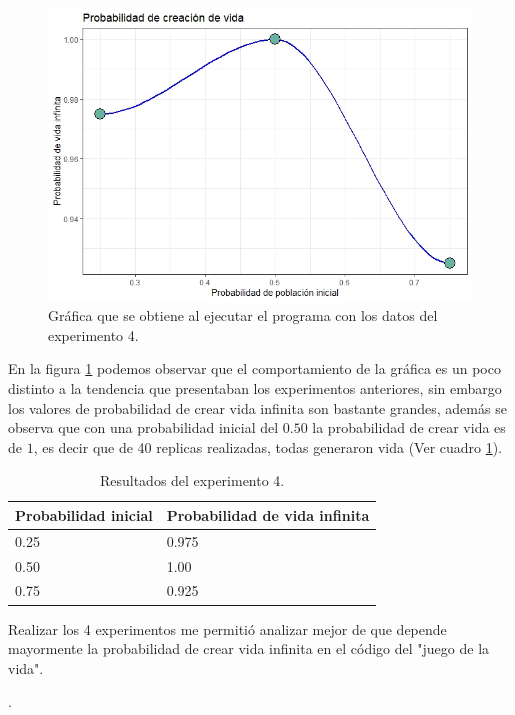 \documentclass{article}
\begin{document}
\begin{figure} [h!]%
    \centering
    \includegraphics[width=150mm]{Figura4.jpeg} %
    \caption{Gráfica que se obtiene al ejecutar el programa con los datos del experimento 4.}
    \label{Figura 4}
\end{figure}

En la figura \ref{Figura 4} podemos observar que el comportamiento de la gráfica es un poco distinto a la tendencia que presentaban los experimentos anteriores, sin embargo los valores de probabilidad de crear vida infinita son bastante grandes, además se observa que con una probabilidad inicial del $0.50$ la probabilidad de crear vida es de $1$, es decir que de 40 replicas realizadas, todas generaron vida (Ver cuadro \ref{Cuadro 8}).

\begin{table}[ht]
\centering
\begin{tabular}{ |p{3cm}||p{5cm}|}
 \hline
 Probabilidad inicial & Probabilidad de vida infinita\\
 \hline
 0.25 & 0.975 \\
 \hline
 0.50 & 1.00 \\
 \hline
 0.75 & 0.925 \\
 \hline
\end{tabular}
\caption{Resultados del experimento 4.}
\label{Cuadro 8}
\end{table}

Realizar los 4 experimentos me permitió analizar mejor de que depende mayormente la probabilidad de crear vida infinita en el código del "juego de la vida".

\newpage
.
\bigskip
\bigskip
\end{document}
